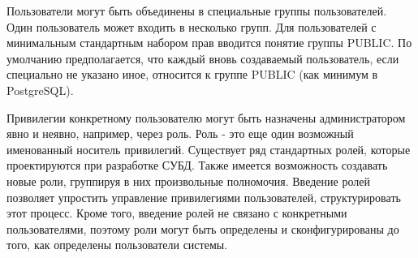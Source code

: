 {Пользователи могут быть объединены в специальные группы пользователей. Один пользователь может входить в 
несколько групп. Для пользователей с минимальным стандартным набором прав вводится понятие группы PUBLIC. 
По умолчанию предполагается, что каждый вновь создаваемый пользователь, если специально не указано иное, 
относится к группе PUBLIC (как минимум в PostgreSQL).

Привилегии конкретному пользователю могут быть назначены администратором явно и неявно, например, через роль. 
Роль - это еще один возможный именованный носитель привилегий. Существует ряд стандартных ролей, которые 
проектируются при разработке СУБД. Также имеется возможность создавать новые роли, группируя в них произвольные 
полномочия. Введение ролей позволяет упростить управление привилегиями пользователей, структурировать этот 
процесс. Кроме того, введение ролей не связано с конкретными пользователями, поэтому роли могут быть определены 
и сконфигурированы до того, как определены пользователи системы.

}
